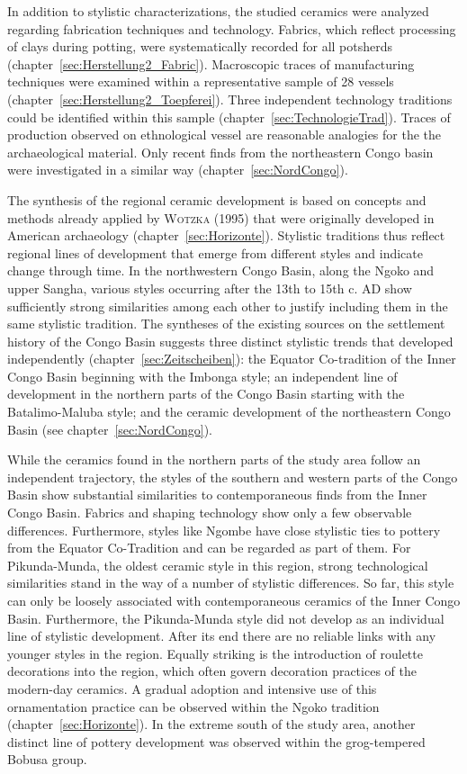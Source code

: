 \begin{multicols}{2}
In addition to stylistic characterizations, the studied ceramics were analyzed regarding fabrication techniques and technology. Fabrics, which reflect processing of clays during potting, were systematically recorded for all potsherds (chapter~\ref{sec:Herstellung2_Fabric}). Macroscopic traces of manufacturing techniques were examined within a representative sample of 28 vessels (chapter~\ref{sec:Herstellung2_Toepferei}). Three independent technology traditions could be identified within this sample (chapter~\ref{sec:TechnologieTrad}). Traces of production observed on ethnological vessel are reasonable analogies for the the archaeological material. Only recent finds from the northeastern Congo basin were investigated in a similar way (chapter~\ref{sec:NordCongo}). 

The synthesis of the regional ceramic development is based on concepts and methods already applied by \textsc{Wotzka} (1995) that were originally developed in American archaeology (chapter~\ref{sec:Horizonte}). Stylistic traditions thus reflect regional lines of development that emerge from different styles and indicate change through time. In the northwestern Congo Basin, along the Ngoko and upper Sangha, various styles occurring after the 13th to 15th c. AD show sufficiently strong similarities among each other to justify including them in the same stylistic tradition. The syntheses of the existing sources on the settlement history of the Congo Basin suggests three distinct stylistic trends that developed independently (chapter~\ref{sec:Zeitscheiben}): the Equator Co-tradition of the Inner Congo Basin beginning with the Imbonga style; an independent line of development in the northern parts of the Congo Basin starting with the Batalimo-Maluba style; and the ceramic development of the northeastern Congo Basin (see chapter~\ref{sec:NordCongo}).

While the ceramics found in the northern parts of the study area follow an independent trajectory, the styles of the southern and western parts of the Congo Basin show substantial similarities to contemporaneous finds from the Inner Congo Basin. Fabrics and shaping technology show only a few observable differences. Furthermore, styles like Ngombe have close stylistic ties to pottery from the Equator Co-Tradition and can be regarded as part of them. For Pikunda-Munda, the oldest ceramic style in this region, strong technological similarities stand in the way of a number of stylistic differences. So far, this style can only be loosely associated with contemporaneous ceramics of the Inner Congo Basin. Furthermore, the Pikunda-Munda style did not develop as an individual line of stylistic development. After its end there are no reliable links with any younger styles in the region. Equally striking is the introduction of roulette decorations into the region, which often govern decoration practices of the modern-day ceramics. A gradual adoption and intensive use of this ornamentation practice can be observed within the Ngoko tradition (chapter~\ref{sec:Horizonte}). In the extreme south of the study area, another distinct line of pottery development was observed within the grog-tempered Bobusa group.


\end{multicols}
